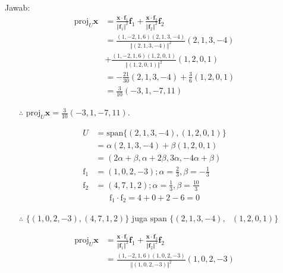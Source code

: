 \documentclass[12pt, a4paper]{scrartcl}
\begin{document}
\begin{enumerate}
\begin{enumerate}
                Jawab:
                \begin{align*}
                    \mbox{proj}_U \textbf{x} &= \frac{\textbf{x} \cdot \textbf{f}_1}{\Vert \textbf{f}_1 \Vert^2} \textbf{f}_1 + \frac{\textbf{x} \cdot \textbf{f}_2}{\Vert \textbf{f}_2 \Vert^2} \textbf{f}_2
                    \\ &= \frac{(1,-2,1,6) (2,1,3,-4)}{\Vert (2,1,3,-4) \Vert^2} (2,1,3,-4) 
                    \\ &+ \frac{(1,-2,1,6) (1,2,0,1)}{\Vert (1,2,0,1) \Vert^2} (1,2,0,1)
                    \\ &= -\frac{21}{30} (2,1,3,-4)+ \frac{3}{6}(1,2,0,1)
                    \\ &= \frac{3}{10}(-3,1,-7,11)
                \end{align*}
                \begin{itemize}
                    \item[$\therefore$] $\mbox{proj}_U \textbf{x} = \frac{3}{10}(-3,1,-7,11)$.
                \end{itemize}
                \begin{align*}
                    U &= \mbox{span}\{(2,1,3,-4),(1,2,0,1)\}
                    \\ &= \alpha(2,1,3,-4) + \beta(1,2,0,1)
                    \\ &= (2\alpha+\beta,\alpha+2\beta,3\alpha,-4\alpha+\beta)
                    \\\mbox{f}_1 &= (1,0,2,-3) ; \alpha = \frac{2}{3}, \beta = -\frac{1}{3}
                    \\\mbox{f}_2 &= (4,7,1,2) ; \alpha = \frac{1}{3}, \beta = \frac{10}{3}
                \end{align*}
                \begin{align*}
                    \mbox{f}_1\cdot\mbox{f}_2 = 4+0+2-6 = 0
                \end{align*}
                \begin{itemize}
                    \item[$\therefore$] $\{(1,0,2,-3),(4,7,1,2)\}$ juga $\mbox{span } \{(2, 1, 3, -4), \mbox{ }(1, 2, 0, 1)\}$
                \end{itemize}
                \begin{align*}
                    \mbox{proj}_U \textbf{x} &= \frac{\textbf{x} \cdot \textbf{f}_1}{\Vert \textbf{f}_1 \Vert^2} \textbf{f}_1 + \frac{\textbf{x} \cdot \textbf{f}_2}{\Vert \textbf{f}_2 \Vert^2} \textbf{f}_2
                    \\ &= \frac{(1,-2,1,6) (1,0,2,-3)}{\Vert (1,0,2,-3) \Vert^2} (1,0,2,-3) 

\end{align*}
\end{enumerate}
\end{enumerate}
\end{document}
